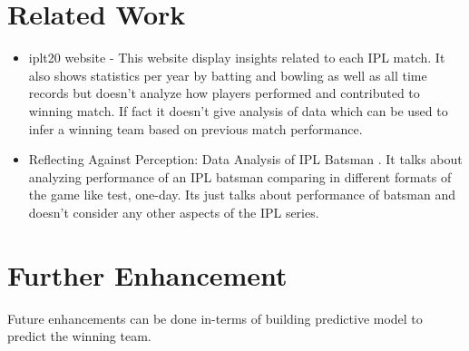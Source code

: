 \section{Related Work} \label{relwork}
\begin {itemize}
\item
iplt20 website - \cite{www-iplt20} 
This website display insights related to each IPL match. It also shows statistics per year
by batting and bowling as well as all time records but doesn't analyze how players
performed and contributed to winning match. If fact it doesn't give analysis of data which
can be used to infer a winning team based on previous match performance.

\item
Reflecting Against Perception: Data Analysis of IPL Batsman \cite{kumar2014reflecting}.
It talks about analyzing performance of an IPL batsman comparing in different formats of 
the game like test, one-day. Its just talks about performance of batsman and doesn't consider
any other aspects of the IPL series. 

\end {itemize}

\section{Further Enhancement} \label{enhancements}
Future enhancements can be done in-terms of building predictive model to predict the winning team.
